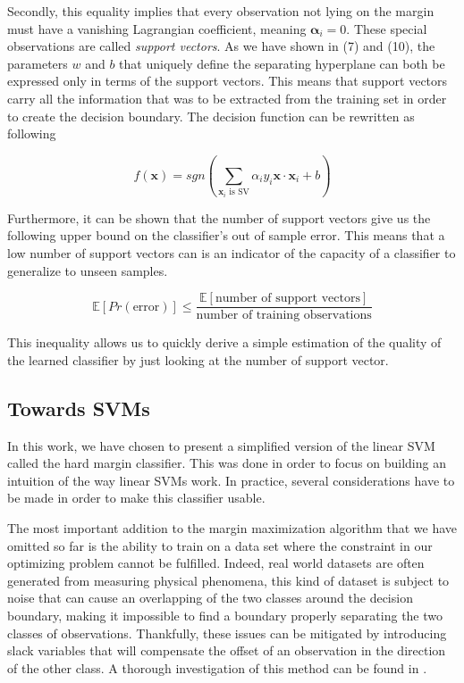 Secondly, this equality implies that every observation not lying on the margin must have a vanishing Lagrangian coefficient, meaning $\boldsymbol{\alpha}_i = 0$. These special observations are called \textit{support vectors}. As we have shown in (7) and (10), the parameters $w$ and $b$ that uniquely define the separating hyperplane can both be expressed only in terms of the support vectors. This means that support vectors carry all the information that was to be extracted from the training set in order to create the decision boundary. The decision function can be rewritten as following

\begin{equation}
  f(\mathbf{x}) = sgn\left(\sum_{\mathbf{x}_i \text{ is SV}}\alpha_iy_i\mathbf{x} \cdot \mathbf{x}_i + b\right)
\end{equation}

Furthermore, it can be shown \cite{Vapnik:1995:NSL:211359} that the number of support vectors give us the following upper bound on the classifier's out of sample error. This means that a low number of support vectors can is an indicator of the capacity of a classifier to generalize to unseen samples. 

\begin{equation}
  \mathbb{E}\left[Pr\left(\text{error}\right)\right] \leq \frac{\mathbb{E}\left[\text{number of support vectors}\right]}{\text{number of training observations}}
\end{equation}

This inequality allows us to quickly derive a simple estimation of the quality of the learned classifier by just looking at the number of support vector.

\subsection{Towards SVMs}

In this work, we have chosen to present a simplified version of the linear SVM called the hard margin classifier. This was done in order to focus on building an intuition of the way linear SVMs work. In practice, several considerations have to be made in order to make this classifier usable.

The most important addition to the margin maximization algorithm that we have omitted so far is the ability to train on a data set where the constraint in our optimizing problem cannot be fulfilled. Indeed, real world datasets are often generated from measuring physical phenomena, this kind of dataset is subject to noise that can cause an overlapping of the two classes around the decision boundary, making it impossible to find a boundary properly separating the two classes of observations. Thankfully, these issues can be mitigated by introducing slack variables that will compensate the offset of an observation in the direction of the other class. A thorough investigation of this method can be found in \cite{Schoelkopf95extractingsupport}.

